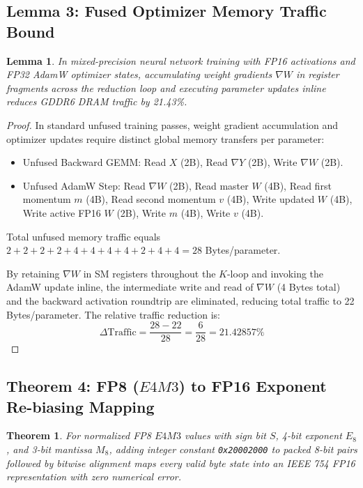 \documentclass[10pt,twocolumn,letterpaper]{article}
\newtheorem{theorem}{Theorem}
\newtheorem{lemma}{Lemma}
\begin{document}
\subsection{Lemma 3: Fused Optimizer Memory Traffic Bound}
\begin{lemma}
In mixed-precision neural network training with FP16 activations and FP32 AdamW optimizer states, accumulating weight gradients $\nabla W$ in register fragments across the reduction loop and executing parameter updates inline reduces GDDR6 DRAM traffic by 21.43\%.
\end{lemma}

\begin{proof}
In standard unfused training passes, weight gradient accumulation and optimizer updates require distinct global memory transfers per parameter:
\begin{itemize}
  \item Unfused Backward GEMM: Read $X$ (2B), Read $\nabla Y$ (2B), Write $\nabla W$ (2B).
  \item Unfused AdamW Step: Read $\nabla W$ (2B), Read master $W$ (4B), Read first momentum $m$ (4B), Read second momentum $v$ (4B), Write updated $W$ (4B), Write active FP16 $W$ (2B), Write $m$ (4B), Write $v$ (4B).
\end{itemize}
Total unfused memory traffic equals $2 + 2 + 2 + 2 + 4 + 4 + 4 + 4 + 2 + 4 + 4 = 28$ Bytes/parameter.

By retaining $\nabla W$ in SM registers throughout the $K$-loop and invoking the AdamW update inline, the intermediate write and read of $\nabla W$ (4 Bytes total) and the backward activation roundtrip are eliminated, reducing total traffic to 22 Bytes/parameter. The relative traffic reduction is:
\begin{equation}
\Delta \text{Traffic} = \frac{28 - 22}{28} = \frac{6}{28} = 21.42857\%
\end{equation}
\end{proof}

\subsection{Theorem 4: FP8 ($E4M3$) to FP16 Exponent Re-biasing Mapping}
\begin{theorem}
For normalized FP8 $E4M3$ values with sign bit $S$, 4-bit exponent $E_8$, and 3-bit mantissa $M_8$, adding integer constant \texttt{0x20002000} to packed 8-bit pairs followed by bitwise alignment maps every valid byte state into an IEEE 754 FP16 representation with zero numerical error.
\end{theorem}
\end{document}
